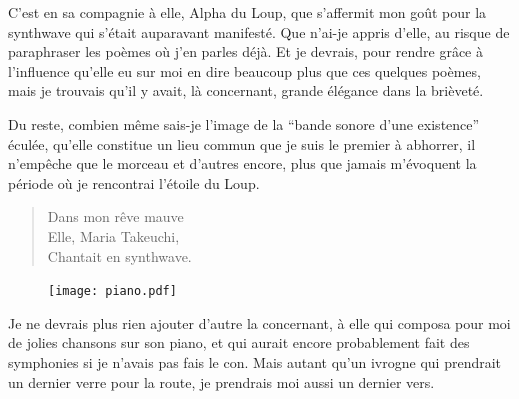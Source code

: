 \begin{prose}
  C’est en sa compagnie à elle, Alpha du Loup, que s’affermit mon goût pour la synthwave qui s’était auparavant manifesté. Que n’ai-je appris d’elle, au risque de paraphraser les poèmes où j’en parles déjà.
  Et je devrais, pour rendre grâce à l’influence  qu’elle eu sur moi en dire beaucoup plus que ces quelques poèmes, mais je trouvais qu’il y avait, là concernant, grande élégance dans la brièveté.
\end{prose}

\begin{prose}
  Du reste, combien même sais-je l’image de la \enquote{bande sonore d’une existence} éculée, qu’elle constitue un lieu commun que je suis le premier à abhorrer, il n’empêche que le morceau  et d’autres encore, plus que jamais m’évoquent la période où je rencontrai l’étoile du Loup.
\end{prose}

\begin{verse}%
  \haiku%
  Dans mon rêve mauve\\  %
  Elle, Maria {Takeuchi},\\  %
  Chantait en synthwave.
\end{verse}

\begin{figure}[h]
  \centering
  \texttt{[image: piano.pdf]}
  \captionsetup{labelformat=empty}
  \caption[Idéotexte de ]{}
\end{figure}

\begin{prose}
  Je ne devrais plus rien ajouter d’autre la concernant, à elle qui composa pour moi de jolies chansons sur son piano, et qui aurait encore probablement fait des symphonies si je n’avais pas fais le con. Mais autant qu’un ivrogne qui prendrait un dernier verre pour la route, je prendrais moi aussi un dernier vers.
\end{prose}

